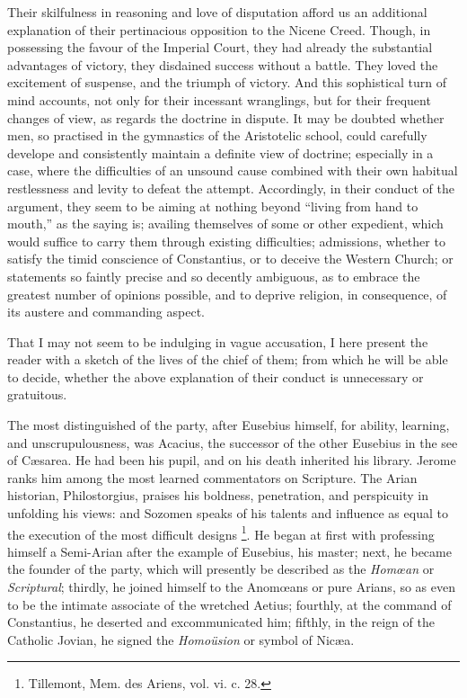 Their skilfulness in reasoning and love of disputation afford us an
additional explanation of their pertinacious opposition to the Nicene
Creed. Though, in possessing the favour of the Imperial Court, they
had already the substantial advantages of victory, they disdained
success without a battle. They loved the excitement of suspense, and
the triumph of victory. And this sophistical turn of mind accounts,
not only for their incessant wranglings, but for their frequent
changes of view, as regards the doctrine in dispute. It may be doubted
whether men, so practised in the gymnastics of the Aristotelic school,
could carefully develope and consistently maintain a definite view of
doctrine; especially in a case, where the difficulties of an unsound
cause combined with their own habitual restlessness and levity to
defeat the attempt. Accordingly, in their conduct of the argument,
they seem to be aiming at nothing beyond ``living from hand to
mouth,'' as the saying is; availing themselves of some or other
expedient, which would suffice to carry them through existing
difficulties; admissions, whether to satisfy the timid conscience of
Constantius, or to deceive the Western Church; or statements so
faintly precise and so decently ambiguous, as to embrace the greatest
number of opinions possible, and to deprive religion, in consequence,
of its austere and commanding aspect.

That I may not seem to be indulging in vague accusation, I here
present the reader with a sketch of the lives of the chief of them;
from which he will be able to decide, whether the above explanation of
their conduct is unnecessary or gratuitous.

The most distinguished of the party, after Eusebius himself, for
ability, learning, and unscrupulousness, was Acacius, the successor of
the other Eusebius in the see of Cæsarea. He had been his pupil, and
on his death inherited his library. Jerome ranks him among the most
learned commentators on Scripture. The Arian historian, Philostorgius,
praises his boldness, penetration, and perspicuity in unfolding his
views: and Sozomen speaks of his talents and influence as equal to the
execution of the most difficult designs \footnote{Tillemont, Mem. des Ariens, vol. vi. c. 28.}. He began at first with professing himself a Semi-Arian after
the example of Eusebius, his master; next, he became the founder of
the party, which will presently be described as the \emph{Homœan} or \emph{Scriptural};
thirdly, he joined himself to the Anomœans or pure Arians, so as even
to be the intimate associate of the wretched Aetius; fourthly, at the
command of Constantius, he deserted and excommunicated him; fifthly,
in the reign of the Catholic Jovian, he signed the \emph{Homoüsion}
or symbol of Nicæa.

